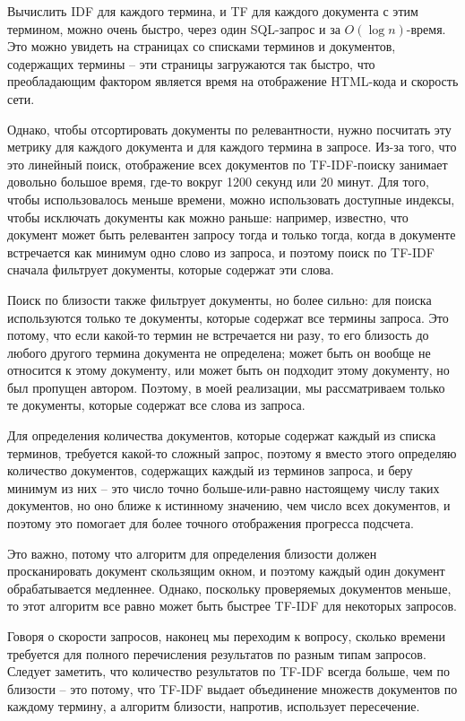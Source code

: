 \documentclass[a4page]{article}
\begin{document}
Вычислить IDF для каждого термина, и TF для каждого документа с этим термином, можно очень быстро, через один SQL-запрос и за $O(\log n)$-время. Это можно увидеть на страницах со списками терминов и документов, содержащих термины -- эти страницы загружаются так быстро, что преобладающим фактором является время на отображение HTML-кода и скорость сети.

Однако, чтобы отсортировать документы по релевантности, нужно посчитать эту метрику для каждого документа и для каждого термина в запросе. Из-за того, что это линейный поиск, отображение всех документов по TF-IDF-поиску занимает довольно большое время, где-то вокруг 1200 секунд или 20 минут. Для того, чтобы использовалось меньше времени, можно использовать доступные индексы, чтобы исключать документы как можно раньше: например, известно, что документ может быть релевантен запросу тогда и только тогда, когда в документе встречается как минимум одно слово из запроса, и поэтому поиск по TF-IDF сначала фильтрует документы, которые содержат эти слова.

Поиск по близости также фильтрует документы, но более сильно: для поиска используются только те документы, которые содержат все термины запроса. Это потому, что если какой-то термин не встречается ни разу, то его близость до любого другого термина документа не определена; может быть он вообще не относится к этому документу, или может быть он подходит этому документу, но был пропущен автором. Поэтому, в моей реализации, мы рассматриваем только те документы, которые содержат все слова из запроса.

Для определения количества документов, которые содержат каждый из списка терминов, требуется какой-то сложный запрос, поэтому я вместо этого определяю количество документов, содержащих каждый из терминов запроса, и беру минимум из них -- это число точно больше-или-равно настоящему числу таких документов, но оно ближе к истинному значению, чем число всех документов, и поэтому это помогает для более точного отображения прогресса подсчета.

Это важно, потому что алгоритм для определения близости должен просканировать документ скользящим окном, и поэтому каждый один документ обрабатывается медленнее. Однако, поскольку проверяемых документов меньше, то этот алгоритм все равно может быть быстрее TF-IDF для некоторых запросов.

Говоря о скорости запросов, наконец мы переходим к вопросу, сколько времени требуется для полного перечисления результатов по разным типам запросов. Следует заметить, что количество результатов по TF-IDF всегда больше, чем по близости -- это потому, что TF-IDF выдает объединение множеств документов по каждому термину, а алгоритм близости, напротив, использует пересечение.
\end{document}
